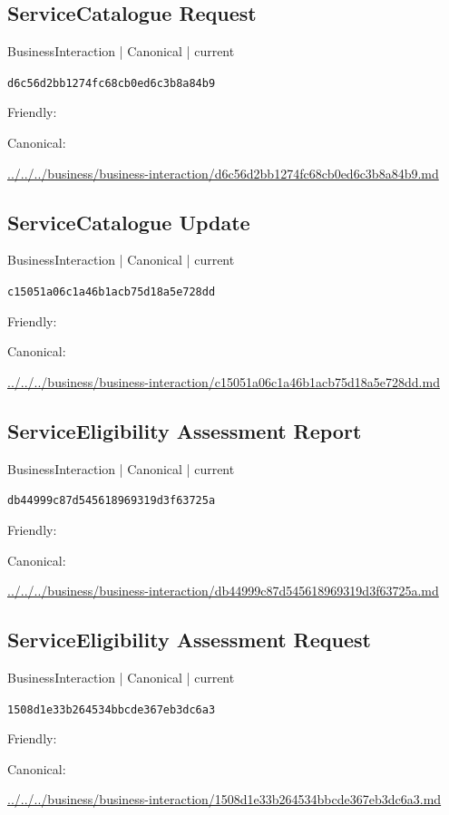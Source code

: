 \documentclass[10pt,a4paper]{article}
\begin{document}
\subsection*{ServiceCatalogue Request}
{\small BusinessInteraction | Canonical | current}\par
\texttt{d6c56d2bb1274fc68cb0ed6c3b8a84b9}\par
Friendly: \par
Canonical: \par
{\footnotesize\url{../../../business/business-interaction/d6c56d2bb1274fc68cb0ed6c3b8a84b9.md}}\par
\subsection*{ServiceCatalogue Update}
{\small BusinessInteraction | Canonical | current}\par
\texttt{c15051a06c1a46b1acb75d18a5e728dd}\par
Friendly: \par
Canonical: \par
{\footnotesize\url{../../../business/business-interaction/c15051a06c1a46b1acb75d18a5e728dd.md}}\par
\subsection*{ServiceEligibility Assessment Report}
{\small BusinessInteraction | Canonical | current}\par
\texttt{db44999c87d545618969319d3f63725a}\par
Friendly: \par
Canonical: \par
{\footnotesize\url{../../../business/business-interaction/db44999c87d545618969319d3f63725a.md}}\par
\subsection*{ServiceEligibility Assessment Request}
{\small BusinessInteraction | Canonical | current}\par
\texttt{1508d1e33b264534bbcde367eb3dc6a3}\par
Friendly: \par
Canonical: \par
{\footnotesize\url{../../../business/business-interaction/1508d1e33b264534bbcde367eb3dc6a3.md}}\par
\end{document}
